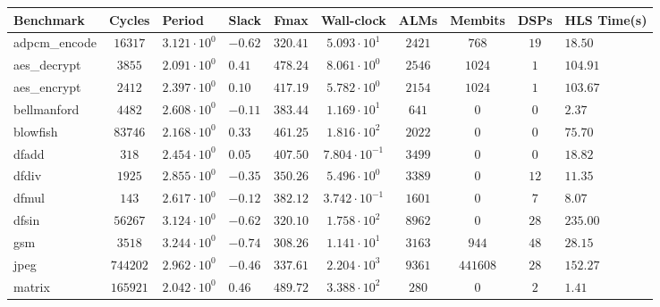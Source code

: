\begin{tabular}{|l|c|HHc|c|c|c|cH|}
\hline
Benchmark     & Cycles       & Period                 & Slack     & Fmax       & Wall-clock              & ALMs      & Membits    & DSPs    & HLS Time(s) \\
\hline
adpcm\_encode & $ 16317    $ & $ 3.121 \cdot 10^{0} $ & $ -0.62 $ & $ 320.41 $ & $ 5.093 \cdot 10^{1}  $ & $ 2421  $ & $ 768    $ & $ 19  $ & $ 18.50   $ \\
aes\_decrypt  & $ 3855     $ & $ 2.091 \cdot 10^{0} $ & $ 0.41  $ & $ 478.24 $ & $ 8.061 \cdot 10^{0}  $ & $ 2546  $ & $ 1024   $ & $ 1   $ & $ 104.91  $ \\
aes\_encrypt  & $ 2412     $ & $ 2.397 \cdot 10^{0} $ & $ 0.10  $ & $ 417.19 $ & $ 5.782 \cdot 10^{0}  $ & $ 2154  $ & $ 1024   $ & $ 1   $ & $ 103.67  $ \\
bellmanford   & $ 4482     $ & $ 2.608 \cdot 10^{0} $ & $ -0.11 $ & $ 383.44 $ & $ 1.169 \cdot 10^{1}  $ & $ 641   $ & $ 0      $ & $ 0   $ & $ 2.37    $ \\
blowfish      & $ 83746    $ & $ 2.168 \cdot 10^{0} $ & $ 0.33  $ & $ 461.25 $ & $ 1.816 \cdot 10^{2}  $ & $ 2022  $ & $ 0      $ & $ 0   $ & $ 75.70   $ \\
dfadd         & $ 318      $ & $ 2.454 \cdot 10^{0} $ & $ 0.05  $ & $ 407.50 $ & $ 7.804 \cdot 10^{-1} $ & $ 3499  $ & $ 0      $ & $ 0   $ & $ 18.82   $ \\
dfdiv         & $ 1925     $ & $ 2.855 \cdot 10^{0} $ & $ -0.35 $ & $ 350.26 $ & $ 5.496 \cdot 10^{0}  $ & $ 3389  $ & $ 0      $ & $ 12  $ & $ 11.35   $ \\
dfmul         & $ 143      $ & $ 2.617 \cdot 10^{0} $ & $ -0.12 $ & $ 382.12 $ & $ 3.742 \cdot 10^{-1} $ & $ 1601  $ & $ 0      $ & $ 7   $ & $ 8.07    $ \\
dfsin         & $ 56267    $ & $ 3.124 \cdot 10^{0} $ & $ -0.62 $ & $ 320.10 $ & $ 1.758 \cdot 10^{2}  $ & $ 8962  $ & $ 0      $ & $ 28  $ & $ 235.00  $ \\
gsm           & $ 3518     $ & $ 3.244 \cdot 10^{0} $ & $ -0.74 $ & $ 308.26 $ & $ 1.141 \cdot 10^{1}  $ & $ 3163  $ & $ 944    $ & $ 48  $ & $ 28.15   $ \\
jpeg          & $ 744202   $ & $ 2.962 \cdot 10^{0} $ & $ -0.46 $ & $ 337.61 $ & $ 2.204 \cdot 10^{3}  $ & $ 9361  $ & $ 441608 $ & $ 28  $ & $ 152.27  $ \\
matrix        & $ 165921   $ & $ 2.042 \cdot 10^{0} $ & $ 0.46  $ & $ 489.72 $ & $ 3.388 \cdot 10^{2}  $ & $ 280   $ & $ 0      $ & $ 2   $ & $ 1.41    $ \\

\end{tabular}
